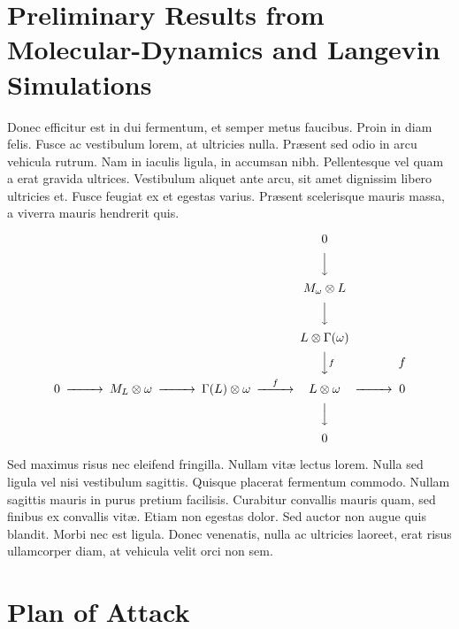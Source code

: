 \documentclass[12pt]{amsart}
\theoremstyle{definition}
\numberwithin{equation}{section}
\begin{document}
\section{Preliminary Results from Molecular-Dynamics and Langevin Simulations}
%

Donec efficitur est in dui fermentum, et semper metus faucibus. Proin in diam felis. Fusce ac vestibulum lorem, at ultricies nulla. Pr{\ae}sent sed odio in arcu vehicula rutrum. Nam in iaculis ligula, in accumsan nibh. Pellentesque vel quam a erat gravida ultrices. Vestibulum aliquet ante arcu, sit amet dignissim libero ultricies et. Fusce feugiat ex et egestas varius. Pr{\ae}sent scelerisque mauris massa, a viverra mauris hendrerit quis.


\[
\begin{CD}
@.          @.                            @.                0\\
@.          @.                            @.                @VVV\\ 
@.          @.                            @.                M_\omega\otimes L\\
@.          @.                            @.                @VVV\\ 
@.          @.                            @.                L\otimes \Gamma(\omega)\\
@.          @.                            @.                @VV{f}V {f}\\  
0@>>>M_L\otimes \omega@>>>\Gamma(L)\otimes \omega@>{f}>> L\otimes \omega@>>>0\\
@. @. @. @VVV\\
@. @. @. 0
\end{CD}
\]

Sed maximus risus nec eleifend fringilla. Nullam vit{\ae} lectus lorem. Nulla sed ligula vel nisi vestibulum sagittis. Quisque placerat fermentum commodo. Nullam sagittis mauris in purus pretium facilisis. Curabitur convallis mauris quam, sed finibus ex convallis vit{\ae}. Etiam non egestas dolor. Sed auctor non augue quis blandit. Morbi nec est ligula. Donec venenatis, nulla ac ultricies laoreet, erat risus ullamcorper diam, at vehicula velit orci non sem. 


\section{Plan of Attack}
\end{document}
